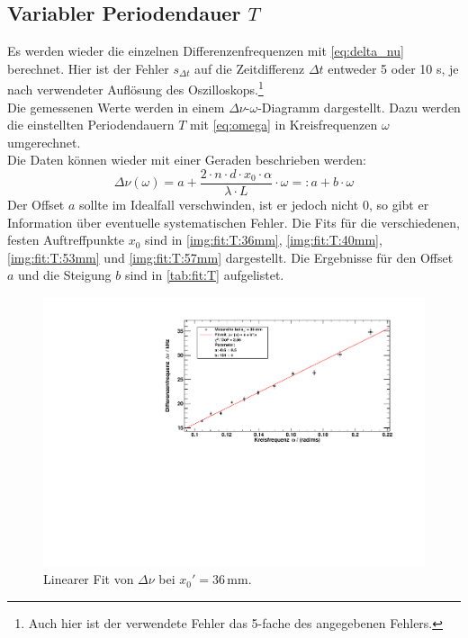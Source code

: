 \subsection{Variabler Periodendauer \texorpdfstring{$T$}{T}}
Es werden wieder die einzelnen Differenzenfrequenzen mit \autoref{eq:delta_nu} berechnet. Hier ist der Fehler $s_{\Delta t}$ 
auf die Zeitdifferenz $\Delta t$ entweder 5 oder 10 \textmu s, je nach verwendeter Auflösung des Oszilloskops.\footnote{Auch hier ist der 
verwendete Fehler das 5-fache des angegebenen Fehlers.} \\
Die gemessenen Werte werden in einem $\Delta \nu$-$\omega$-Diagramm dargestellt. 
Dazu werden die einstellten Periodendauern $T$ mit \autoref{eq:omega} in Kreisfrequenzen $\omega$ umgerechnet. \\
Die Daten können wieder mit einer Geraden beschrieben werden:
\begin{equation}
  \label{eq:nu_omega}
  \Delta \nu (\omega) = a + \frac{2 \cdot n \cdot d \cdot x_0 \cdot \alpha}{\lambda \cdot L} \cdot \omega  =: a + b \cdot \omega
\end{equation}
Der Offset $a$ sollte im Idealfall verschwinden, ist er jedoch nicht 0, so gibt er Information über eventuelle systematischen Fehler.
Die Fits für die verschiedenen, festen Auftreffpunkte $x_0$ sind in \autoref{img:fit:T:36mm}, \autoref{img:fit:T:40mm}, \autoref{img:fit:T:53mm} 
und \autoref{img:fit:T:57mm} dargestellt. Die Ergebnisse für den Offset $a$ und die Steigung $b$ sind in \autoref{tab:fit:T} aufgelistet.

\begin{figure}[H]
\begin{center}
  \includegraphics[width=\textwidth]{../img/fit_x0_36mm.pdf}
  \caption{Linearer Fit von $\Delta \nu$ bei $x_0' = 36$\,mm.}
  \label{img:fit:T:36mm}
\end{center}
\end{figure}

